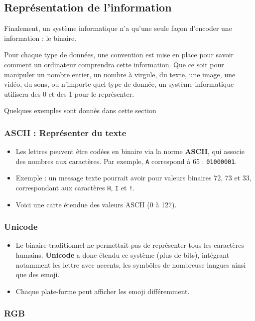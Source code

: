 \subsection{Représentation de l’information}
Finalement, un système informatique n'a qu'une seule façon d'encoder une information : le binaire.

Pour chaque type de données, une convention est mise en place pour savoir comment un ordinateur comprendra cette information.
Que ce soit pour manipuler un nombre entier, un nombre à virgule, du texte, une image, une vidéo, du sons, ou n'importe quel type de donnée, un système informatique utilisera des 0 et des 1 pour le représenter.

Quelques exemples sont donnés dans cette section
\subsubsection{ASCII : Représenter du texte}

\begin{itemize}
	\item Les lettres peuvent être codées en binaire via la norme \textbf{ASCII}, qui associe des nombres aux caractères. Par exemple, \texttt{A} correspond à 65 : \texttt{01000001}.
	\item Exemple : un message texte pourrait avoir pour valeurs binaires 72, 73 et 33, correspondant aux caractères \texttt{H}, \texttt{I} et \texttt{!}.
	\item Voici une carte étendue des valeurs ASCII (0 à 127).
\end{itemize}

\subsubsection{Unicode}

\begin{itemize}
	\item Le binaire traditionnel ne permettait pas de représenter tous les caractères humains. \textbf{Unicode} a donc étendu ce système (plus de bits), intégrant notamment les lettre avec accents, les symbôles de nombreuse langues ainsi que des emoji.
	\item Chaque plate-forme peut afficher les emoji différemment.
\end{itemize}

\subsubsection{RGB}

